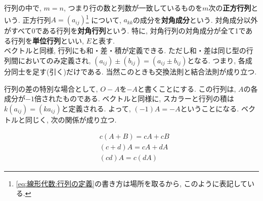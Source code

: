 \documentclass[a4j,dvipdfmx]{jsarticle}
\numberwithin{equation}{section}
\begin{document}
            行列の中で, $m=n$, つまり行の数と列数が一致しているものを$m$次の\textbf{正方行列}という. 正方行列$A=(a_{ij})$\footnote{\eqref{eq:線形代数:行列の定義}の書き方は場所を取るから, このように表記している.}
            について, $a_{kk}$の成分を\textbf{対角成分}という. 対角成分以外がすべて0である行列を\textbf{対角行列}という.
            特に, 対角行列の対角成分が全て1である行列を\textbf{単位行列}といい, $E$と表す.\\

            ベクトルと同様, 行列にも和・差・積が定義できる. ただし和・差は同じ型の行列間においてのみ定義され, $(a_{ij})\pm(b_{ij})=(a_{ij}\pm b_{ij})$となる.
            つまり, 各成分同士を足す(引く)だけである. 当然このときも交換法則と結合法則が成り立つ.

            行列の差の特別な場合として, $O-A$を$-A$と書くことにする. この行列は, $A$の各成分が$-1$倍されたものである. ベクトルと同様に, スカラーと行列の積は$k(a_{ij})=(ka_{ij})$と定義される. 
            よって, $(-1)A=-A$ということになる. ベクトルと同じく, 次の関係が成り立つ.

            \begin{align}
                &c(A + B)=cA + cB\\
                &(c+d)A=cA + dA\\
                &(cd)A=c(dA) 
            \end{align}
\end{document}
